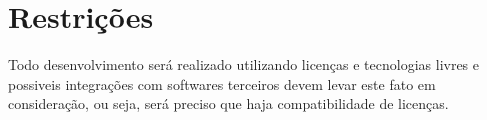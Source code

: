 %
%        
%         
%			
%
%
%			
%


\section{Restrições}\label{sec:restrições}
Todo desenvolvimento será realizado utilizando licenças e tecnologias livres e possiveis integrações com softwares terceiros devem levar este fato em consideração, ou seja, será preciso que haja compatibilidade de licenças.